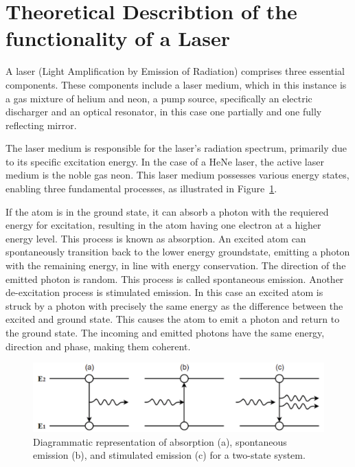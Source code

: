 \section{Theoretical Describtion of the functionality of a Laser}
\label{sec:theory}

A laser (Light Amplification by Emission of Radiation) comprises
three essential components. These components include a laser medium, 
which in this instance is a gas mixture of helium and neon, a pump
source, specifically an electric discharger and an optical resonator, 
in this case one partially and one fully reflecting mirror.

The laser medium is responsible for the laser's radiation spectrum, 
primarily due to its specific excitation energy. In the case 
of a HeNe laser, the active laser medium is the noble gas neon. 
This laser medium possesses various energy states, enabling three 
fundamental processes, as illustrated in Figure~\ref{fig:emission}.

If the atom is in the ground state, it can absorb a photon with
the requiered energy for excitation, resulting in the atom having 
one electron at a higher energy level. This process is known as 
absorption. An excited atom can spontaneously transition back 
to the lower energy groundstate, emitting a photon with the remaining 
energy, in line with energy conservation. The direction of the emitted
photon is random. This process is called spontaneous emission.
Another de-excitation process is stimulated emission. In this case
an excited atom is struck by a photon with precisely the same 
energy as the difference between the excited and ground state. 
This causes the atom to emit a photon and return to the ground state.
The incoming and emitted photons have the same energy, direction and 
phase, making them coherent.

\begin{figure}
    \centering
    \includegraphics[width=0.8\linewidth]{pictures/emission.png} %
    \caption{Diagrammatic representation of absorption (a), spontaneous emission (b), and stimulated emission (c) for a two-state system. \cite{emission}}
    \label{fig:emission}
\end{figure}

